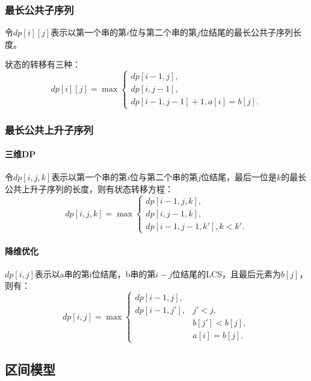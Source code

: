 \subsubsection{最长公共子序列}
令$dp[i][j]$表示以第一个串的第$i$位与第二个串的第$j$位结尾的最长公共子序列长度。

状态的转移有三种：
\begin{equation*}
    dp[i][j]=\max
    \begin{cases}
        dp[i-1,j],\\
        dp[i,j-1],\\
        dp[i-1,j-1]+1,a[i]=b[j].
    \end{cases}
\end{equation*}
\subsubsection{最长公共上升子序列}
\paragraph{三维DP}
令$dp[i,j,k]$表示以第一个串的第$i$位与第二个串的第$j$位结尾，最后一位是$k$的最长公共上升子序列的长度，则有状态转移方程：
\begin{equation*}
    dp[i,j,k]=\max
    \begin{cases}
        dp[i-1,j,k],\\
        dp[i,j-1,k],\\
        dp[i-1,j-1,k'], k<k'.
    \end{cases}
\end{equation*}

\paragraph{降维优化}
$dp[i,j]$表示以a串的第i位结尾，b串的第$i-j$位结尾的LCS，且最后元素为$b[j]$，则有：
\begin{equation*}
    dp[i,j]=\max
    \begin{cases}
        dp[i-1,j],\\
        dp[i-1,j'],&j'<j,\\
        &b[j']<b[j],\\
        &a[i]=b[j].
    \end{cases}
\end{equation*}

\subsection{区间模型}
